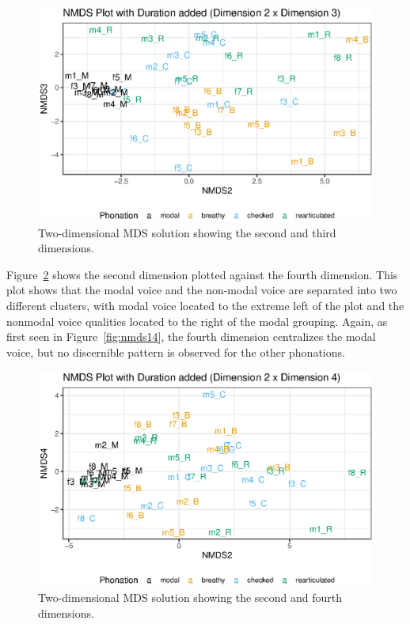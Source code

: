 \begin{figure}[h!]
    \centering
    \includegraphics[width = 0.9\linewidth]{images/MDS/nmds23_dur.eps}
    \caption{Two-dimensional MDS solution showing the second and third dimensions.}
    \label{fig:nmds23}
\end{figure}

Figure~\ref{fig:nmds24} shows the second dimension plotted against the fourth dimension. This plot shows that the modal voice and the non-modal voice are separated into two different clusters, with modal voice located to the extreme left of the plot and the nonmodal voice qualities located to the right of the modal grouping. Again, as first seen in Figure~\ref{fig:nmds14}, the fourth dimension centralizes the modal voice, but no discernible pattern is observed for the other phonations.

\begin{figure}[!h]
    \centering
    \includegraphics[width = \linewidth]{images/MDS/nmds24_dur.eps}
    \caption{Two-dimensional MDS solution showing the second and fourth dimensions.}
    \label{fig:nmds24}
\end{figure}

